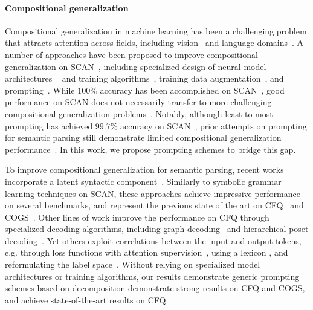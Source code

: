 \documentclass{article} \usepackage{iclr2022_conference,times}
\begin{document}
\paragraph{Compositional generalization} Compositional generalization in machine learning has been a challenging problem that attracts attention across fields, including vision~\citep{johnson2017clevr,bahdanau2019closure,ruis2020benchmark,nikolaus2019compositional} and language domains~\citep{Lake2018GeneralizationWS,Keysers2020MeasuringCG,kim-linzen-2020-cogs,shaw2020compositional,yin-etal-2021-compositional,gan-etal-2022-measuring}. A number of approaches have been proposed to improve compositional generalization on SCAN~\citep{Lake2018GeneralizationWS,loula-etal-2018-rearranging}, including specialized design of neural model architectures ~\citep{xinyun2020neuralsymbolic,nye2020learning,liu2020compositional,shaw2020compositional,russin2019compositional,li2019compositional,gordon2019permutation,herzig2020span} and training algorithms~\citep{lake2019compositional,kim2021sequence}, training data augmentation~\citep{andreas-2020-good,ekina2021recombine}, and prompting~\citep{zhou2022leasttomost}. While $100\%$ accuracy has been accomplished on SCAN~\citep{xinyun2020neuralsymbolic,nye2020learning,liu2020compositional,shaw2020compositional}, good performance on SCAN does not necessarily transfer to more challenging compositional generalization problems~\citep{Furrer2020CompositionalGI}. Notably, although least-to-most prompting has achieved $99.7\%$ accuracy on SCAN~\citep{zhou2022leasttomost}, prior attempts on prompting for semantic parsing still demonstrate limited compositional generalization performance~\citep{Qiu2022EvaluatingTI}. In this work, we propose prompting schemes to bridge this gap.

To improve compositional generalization for semantic parsing, recent works incorporate a latent syntactic component~\citep{qiu-etal-2022-improving,liu-etal-2021-learning-algebraic}. Similarly to symbolic grammar learning techniques on SCAN, these approaches achieve impressive performance on several benchmarks, and represent the previous state of the art on CFQ~\citep{Keysers2020MeasuringCG} and COGS~\citep{kim-linzen-2020-cogs}. Other lines of work improve the performance on CFQ through specialized decoding algorithms, including graph decoding~\citep{gai-etal-2021-grounded-graph} and hierarchical poset decoding~\citep{guo2020hierarchical}. Yet others exploit correlations between the input and output tokens, e.g. through loss functions with attention supervision~\citep{yin-etal-2021-compositional}, using a lexicon \citep{akyurek2021lexicon}, and reformulating the label space~\citep{herzig2021unlocking}. Without relying on specialized model architectures or training algorithms, our results demonstrate generic prompting schemes based on decomposition demonstrate strong results on CFQ and COGS, and achieve state-of-the-art results on CFQ.
\end{document}
